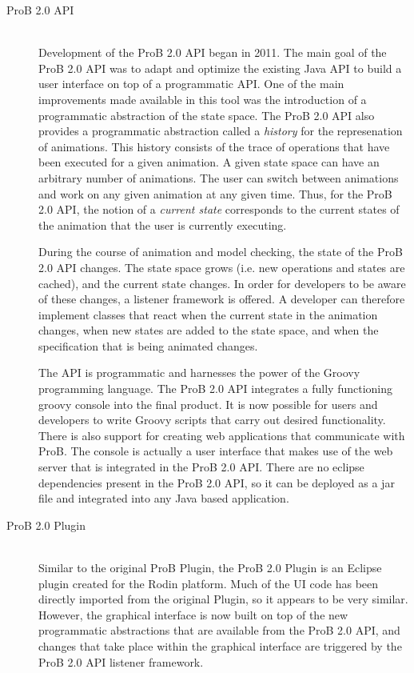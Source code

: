 \begin{description}
	\item[ProB 2.0 API] \hfill \\
	Development of the ProB 2.0 API began in 2011. The main goal of the ProB 2.0 API was to adapt and optimize the existing Java API to build a user interface on top of a programmatic API. One of the main improvements made available in this tool was the introduction of a programmatic abstraction of the state space. The ProB 2.0 API also provides a programmatic abstraction called a \emph{history} for the represenation of animations. This history consists of the trace of operations that have been executed for a given animation. A given state space can have an arbitrary number of animations. The user can switch between animations and work on any given animation at any given time. Thus, for the ProB 2.0 API, the notion of a \emph{current state} corresponds to the current states of the animation that the user is currently executing.

	During the course of animation and model checking, the state of the ProB 2.0 API changes. The state space grows (i.e. new operations and states are cached), and the current state changes. In order for developers to be aware of these changes, a listener framework is offered. A developer can therefore implement classes that react when the current state in the animation changes, when new states are added to the state space, and when the specification that is being animated changes.

	The API is programmatic and harnesses the power of the Groovy programming language. The ProB 2.0 API integrates a fully functioning groovy console into the final product. It is now possible for users and developers to write Groovy scripts that carry out desired functionality. There is also support for creating web applications that communicate with ProB. The console is actually a user interface that makes use of the web server that is integrated in the ProB 2.0 API. There are no eclipse dependencies present in the ProB 2.0 API, so it can be deployed as a jar file and integrated into any Java based application.

	\item[ProB 2.0 Plugin] \hfill \\
	Similar to the original ProB Plugin, the ProB 2.0 Plugin is an Eclipse plugin created for the Rodin platform. Much of the UI code has been directly imported from the original Plugin, so it appears to be very similar. However, the graphical interface is now built on top of the new programmatic abstractions that are available from the ProB 2.0 API, and changes that take place within the graphical interface are triggered by the ProB 2.0 API listener framework.

\end{description}

